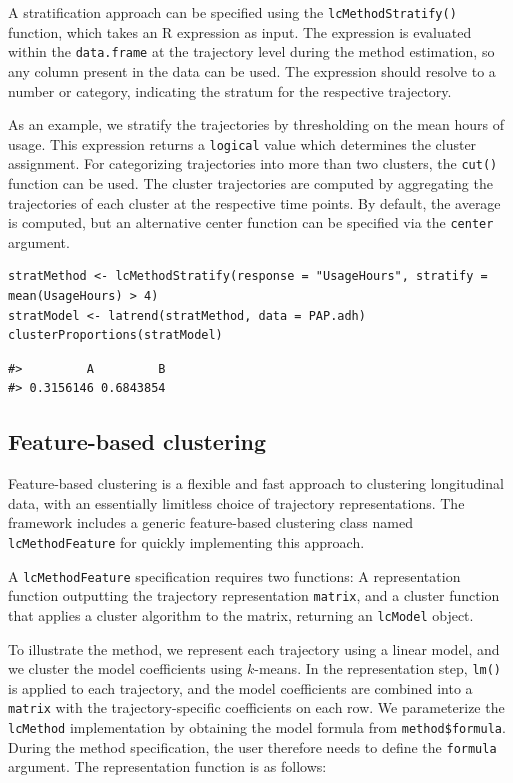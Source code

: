 A stratification approach can be specified using the \texttt{lcMethodStratify()} function, which takes an R expression as input. The expression is evaluated within the \texttt{data.frame} at the trajectory level during the method estimation, so any column present in the data can be used. The expression should resolve to a number or category, indicating the stratum for the respective trajectory.

As an example, we stratify the trajectories by thresholding on the mean hours of usage. This expression returns a \texttt{logical} value which determines the cluster assignment. For categorizing trajectories into more than two clusters, the \texttt{cut()} function can be used. The cluster trajectories are computed by aggregating the trajectories of each cluster at the respective time points. By default, the average is computed, but an alternative center function can be specified via the \texttt{center} argument.

\begin{verbatim}
stratMethod <- lcMethodStratify(response = "UsageHours", stratify = mean(UsageHours) > 4)
stratModel <- latrend(stratMethod, data = PAP.adh)
clusterProportions(stratModel)
\end{verbatim}

\begin{verbatim}
#>         A         B 
#> 0.3156146 0.6843854
\end{verbatim}

\subsection{Feature-based clustering}\label{feature-based-clustering-1}

Feature-based clustering is a flexible and fast approach to clustering longitudinal data, with an essentially limitless choice of trajectory representations. The framework includes a generic feature-based clustering class named \texttt{lcMethodFeature} for quickly implementing this approach.

A \texttt{lcMethodFeature} specification requires two functions: A representation function outputting the trajectory representation \texttt{matrix}, and a cluster function that applies a cluster algorithm to the matrix, returning an \texttt{lcModel} object.

To illustrate the method, we represent each trajectory using a linear model, and we cluster the model coefficients using \(k\)-means. In the representation step, \texttt{lm()} is applied to each trajectory, and the model coefficients are combined into a \texttt{matrix} with the trajectory-specific coefficients on each row. We parameterize the \texttt{lcMethod} implementation by obtaining the model formula from \texttt{method\$formula}. During the method specification, the user therefore needs to define the \texttt{formula} argument. The representation function is as follows:

